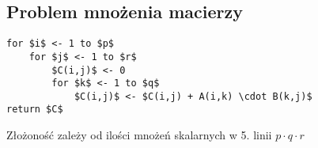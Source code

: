 \subsection{Problem mnożenia macierzy}
\begin{lstlisting}[caption={MatrixMultiply(A,B) - algorytm mnożenia macierzy A($p \times q)$ i $B(q \times r)$ } ]
for $i$ <- 1 to $p$
	for $j$ <- 1 to $r$
		$C(i,j)$ <- 0
		for $k$ <- 1 to $q$
			$C(i,j)$ <- $C(i,j) + A(i,k) \cdot B(k,j)$
return $C$
\end{lstlisting}

Złożoność zależy od ilości mnożeń skalarnych w 5. linii $p \cdot q \cdot r$



